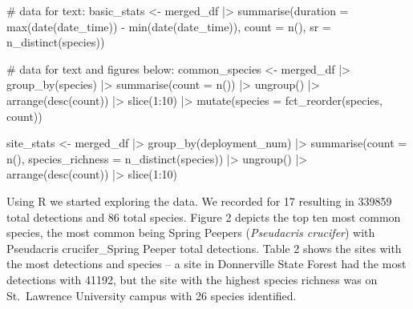 \documentclass[
  letterpaper,
  DIV=11,
  numbers=noendperiod]{scrartcl}
\newenvironment{Shaded}{\begin{snugshade}}{\end{snugshade}}
\newcommand{\AttributeTok}[1]{\textcolor[rgb]{0.40,0.45,0.13}{#1}}
\newcommand{\CommentTok}[1]{\textcolor[rgb]{0.37,0.37,0.37}{#1}}
\newcommand{\DecValTok}[1]{\textcolor[rgb]{0.68,0.00,0.00}{#1}}
\newcommand{\FunctionTok}[1]{\textcolor[rgb]{0.28,0.35,0.67}{#1}}
\newcommand{\NormalTok}[1]{\textcolor[rgb]{0.00,0.23,0.31}{#1}}
\newcommand{\OtherTok}[1]{\textcolor[rgb]{0.00,0.23,0.31}{#1}}
\newcommand{\SpecialCharTok}[1]{\textcolor[rgb]{0.37,0.37,0.37}{#1}}
\begin{document}
\begin{Shaded}
\begin{Highlighting}[]
\CommentTok{\# data for text:}
\NormalTok{basic\_stats }\OtherTok{\textless{}{-}}\NormalTok{ merged\_df }\SpecialCharTok{|\textgreater{}} \FunctionTok{summarise}\NormalTok{(}\AttributeTok{duration =} \FunctionTok{max}\NormalTok{(}\FunctionTok{date}\NormalTok{(date\_time)) }\SpecialCharTok{{-}} \FunctionTok{min}\NormalTok{(}\FunctionTok{date}\NormalTok{(date\_time)),}
\AttributeTok{count =} \FunctionTok{n}\NormalTok{(),}
\AttributeTok{sr =} \FunctionTok{n\_distinct}\NormalTok{(species))}

\CommentTok{\# data for text and figures below:}
\NormalTok{common\_species }\OtherTok{\textless{}{-}}\NormalTok{ merged\_df }\SpecialCharTok{|\textgreater{}} \FunctionTok{group\_by}\NormalTok{(species) }\SpecialCharTok{|\textgreater{}} 
  \FunctionTok{summarise}\NormalTok{(}\AttributeTok{count =} \FunctionTok{n}\NormalTok{()) }\SpecialCharTok{|\textgreater{}} 
  \FunctionTok{ungroup}\NormalTok{() }\SpecialCharTok{|\textgreater{}} 
  \FunctionTok{arrange}\NormalTok{(}\FunctionTok{desc}\NormalTok{(count)) }\SpecialCharTok{|\textgreater{}} 
  \FunctionTok{slice}\NormalTok{(}\DecValTok{1}\SpecialCharTok{:}\DecValTok{10}\NormalTok{) }\SpecialCharTok{|\textgreater{}} 
  \FunctionTok{mutate}\NormalTok{(}\AttributeTok{species =} \FunctionTok{fct\_reorder}\NormalTok{(species, count))}

\NormalTok{site\_stats }\OtherTok{\textless{}{-}}\NormalTok{ merged\_df }\SpecialCharTok{|\textgreater{}} \FunctionTok{group\_by}\NormalTok{(deployment\_num) }\SpecialCharTok{|\textgreater{}} 
  \FunctionTok{summarise}\NormalTok{(}\AttributeTok{count =} \FunctionTok{n}\NormalTok{(),}
  \AttributeTok{species\_richness =} \FunctionTok{n\_distinct}\NormalTok{(species)) }\SpecialCharTok{|\textgreater{}} 
    \FunctionTok{ungroup}\NormalTok{() }\SpecialCharTok{|\textgreater{}} 
    \FunctionTok{arrange}\NormalTok{(}\FunctionTok{desc}\NormalTok{(count)) }\SpecialCharTok{|\textgreater{}} 
    \FunctionTok{slice}\NormalTok{(}\DecValTok{1}\SpecialCharTok{:}\DecValTok{10}\NormalTok{)}
\end{Highlighting}
\end{Shaded}

\linespread{2}

Using R we started exploring the data. We recorded for 17 resulting in
339859 total detections and 86 total species. Figure 2 depicts the top
ten most common species, the most common being Spring Peepers
(\emph{Pseudacris crucifer}) with Pseudacris crucifer\_Spring Peeper
total detections. Table 2 shows the sites with the most detections and
species -- a site in Donnerville State Forest had the most detections
with 41192, but the site with the highest species richness was on
St.~Lawrence University campus with 26 species identified.
\end{document}
